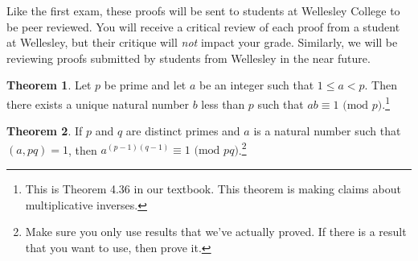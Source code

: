 \documentclass[11pt]{article}
\theoremstyle{definition}
\newtheorem{theorem}{Theorem}
\begin{document}
Like the first exam, these proofs will be sent to students at Wellesley College to be peer reviewed.  You will receive a critical review of each proof from a student at Wellesley, but their critique will \emph{not} impact your grade.  Similarly, we will be reviewing proofs submitted by students from Wellesley in the near future.

\begin{theorem}
Let $p$ be prime and let $a$ be an integer such that $1\leq a <p$.  Then there exists a unique natural number $b$ less than $p$ such that $ab \equiv 1 \mbox{ (mod } p)$.\footnote{This is Theorem 4.36 in our textbook. This theorem is making claims about multiplicative inverses.}
\end{theorem}

\begin{theorem}
If $p$ and $q$ are distinct primes and $a$ is a natural number such that $(a,pq)=1$, then $a^{(p-1)(q-1)}\equiv 1 \mbox{ (mod } pq)$.\footnote{Make sure you only use results that we've actually proved. If there is a result that you want to use, then prove it.}
\end{theorem}
\end{document}
